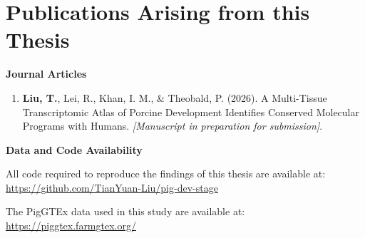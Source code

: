 \markboth{}{}
\chapter*{Publications Arising from this Thesis}
\label{chapter:Publications arising from this thesis}

\textbf{Journal Articles}

\begin{enumerate}
    \item \textbf{Liu, T.}, Lei, R., Khan, I. M., \& Theobald, P. (2026). A Multi-Tissue Transcriptomic Atlas of Porcine Development Identifies Conserved Molecular Programs with Humans. \textit{[Manuscript in preparation for submission]}.
\end{enumerate}

\vspace{1cm}

\textbf{Data and Code Availability}

All code required to reproduce the findings of this thesis are available at: \url{https://github.com/TianYuan-Liu/pig-dev-stage}

The PigGTEx data used in this study are available at: \url{https://piggtex.farmgtex.org/}
